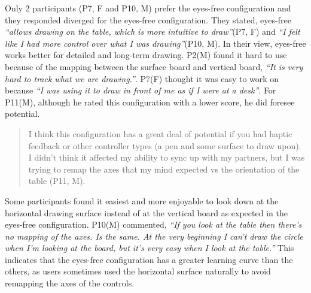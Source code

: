 \documentclass[chi_draft]{sigchi}
\begin{document}
Only 2 participants (P7, F and P10, M) prefer the eyes-free configuration and they responded diverged for the eyes-free configuration. They stated, eyes-free \textit{``allows drawing on the table, which is more intuitive to draw''}(P7, F) and \textit{``I felt like I had more control over what I was drawing''}(P10, M). In their view, eyes-free works better for detailed and long-term drawing.
 P2(M) found it hard to use because of the mapping between the surface board and vertical board, \textit{``It is very hard to track what we are drawing.''}. P7(F) thought it was easy to work on because \textit{``I was using it to draw in front of me as if I were at a desk''}. For P11(M), although he rated this configuration with a lower score, he did foresee potential.
\begin{quote}
    I think this configuration has a great deal of potential if you had haptic feedback or other controller types (a pen and some surface to draw upon). I didn't think it affected my ability to sync up with my partners, but I was trying to remap the axes that my mind expected vs the orientation of the table (P11, M).
\end{quote}
Some participants found it easiest and more enjoyable to look down at the horizontal drawing surface instead of at the vertical board as expected in the eyes-free configuration. P10(M) commented, \textit{``If you look at the table then there's no mapping of the axes. Is the same. At the very beginning I can't draw the circle when I'm looking at the board, but it's very easy when I look at the table.''} This indicates that the eyes-free configuration has a greater learning curve than the others, as users sometimes used the horizontal surface naturally to avoid remapping the axes of the controls. 

\end{document}
